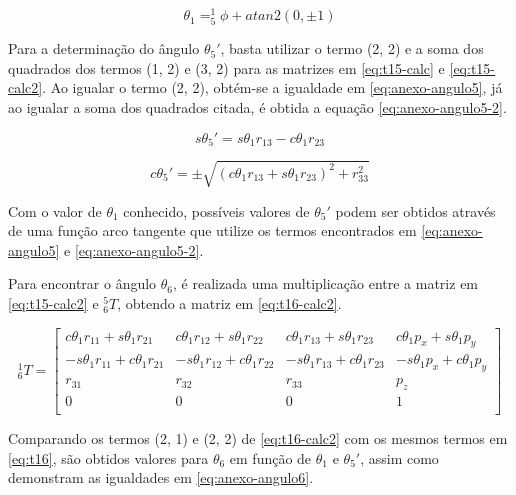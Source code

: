 \begin{equation}
    \label{eq:anexo-angulo1-final}
    \theta_1 = ^1_5\phi + atan2\left(0, \pm1\right)
\end{equation}

Para a determinação do ângulo $\theta_5'$, basta utilizar o termo (2, 2) e a soma dos quadrados 
dos termos (1, 2) e (3, 2) para as matrizes em \ref{eq:t15-calc} e \ref{eq:t15-calc2}. 
Ao igualar o termo (2, 2), obtém-se a igualdade em \ref{eq:anexo-angulo5}, já ao igualar 
a soma dos quadrados citada, é obtida a equação \ref{eq:anexo-angulo5-2}. 

\begin{equation}
    \label{eq:anexo-angulo5}
    s\theta_5' = s\theta_1r_{13} - c\theta_1r_{23}
\end{equation}

\begin{equation}
    \label{eq:anexo-angulo5-2}
    c\theta_5' = \pm \sqrt{(c\theta_1r_{13} + s\theta_1r_{23})^2 + r_{33}^2}
\end{equation}

Com o valor de $\theta_1$ conhecido, possíveis valores de $\theta_5'$ podem ser obtidos 
através de uma função arco tangente que utilize os termos encontrados em \ref{eq:anexo-angulo5}
e \ref{eq:anexo-angulo5-2}.

Para encontrar o ângulo $\theta_6$, é realizada uma multiplicação entre a matriz em 
\ref{eq:t15-calc2} e $^5_6T$, obtendo a matriz em \ref{eq:t16-calc2}.

\begin{equation}
    \label{eq:t16-calc2}
    ^1_6T = 
    \begin{bmatrix}
         c\theta_1r_{11} + s\theta_1r_{21} &  c\theta_1r_{12} + s\theta_1r_{22} & c\theta_1r_{13} + s\theta_1r_{23} & c\theta_1p_x + s\theta_1p_y \\
        -s\theta_1r_{11} + c\theta_1r_{21} & -s\theta_1r_{12} + c\theta_1r_{22} & -s\theta_1r_{13} +c\theta_1r_{23} & -s\theta_1p_x + c\theta_1p_y \\
        r_{31}                             &         r_{32}                     &     r_{33}                        &      p_z  \\
         0             &            0         &              0            &           1         \\    
    \end{bmatrix}
\end{equation}

Comparando os termos (2, 1) e (2, 2) de \ref{eq:t16-calc2} com os mesmos termos em \ref{eq:t16}, são obtidos valores para $\theta_6$
em função de $\theta_1$ e $\theta_5'$, assim como demonstram as igualdades em \ref{eq:anexo-angulo6}.

